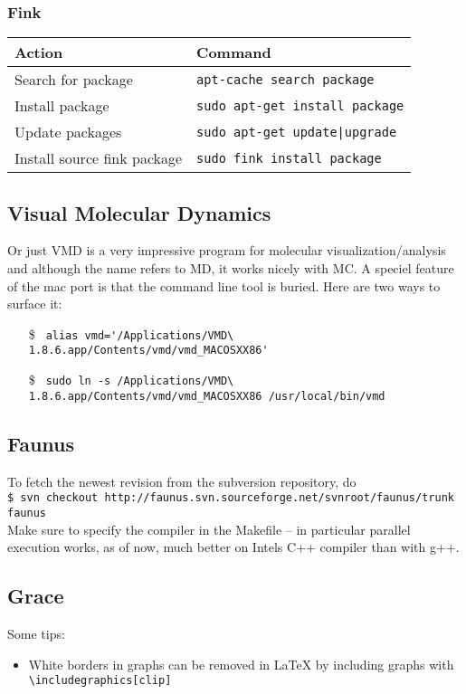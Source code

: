 \documentclass[a4paper,10pt]{article}
\begin{document}
\subsubsection{Fink}
\begin{table}[h!]
\center
\begin{tabular}{ll}\hline\hline
Action              & Command \\\hline
Search for package  & \verb"apt-cache search package"\\
Install package     & \verb"sudo apt-get install package"\\
Update packages     &  \verb"sudo apt-get update|upgrade"\\
Install source fink package & \verb"sudo fink install package"\\\hline
\end{tabular}\end{table}

\subsection{Visual Molecular Dynamics}
Or just VMD is a very impressive program for molecular visualization/analysis and although the name refers to MD, it works nicely with MC. A speciel feature of the mac port is that the command line tool is buried. Here are two ways to surface it:
\begin{itemize}
\item[\$] \verb+ alias vmd='/Applications/VMD\ 1.8.6.app/Contents/vmd/vmd_MACOSXX86'+
\item[\$] \verb+ sudo ln -s /Applications/VMD\ 1.8.6.app/Contents/vmd/vmd_MACOSXX86 /usr/local/bin/vmd+\end{itemize}

\subsection{Faunus}
To fetch the newest revision from the subversion repository, do\\

\verb+$ svn checkout http://faunus.svn.sourceforge.net/svnroot/faunus/trunk faunus+\\

\noindent Make sure to specify the compiler in the Makefile -- in particular parallel execution works, as of now, much better on Intels C++ compiler than with g++.

\subsection{Grace}
Some tips:
\begin{itemize}
\item White borders in graphs can be removed in \LaTeX{} by including graphs with\\

\verb+\includegraphics[clip]+
\end{itemize}
\end{document}
